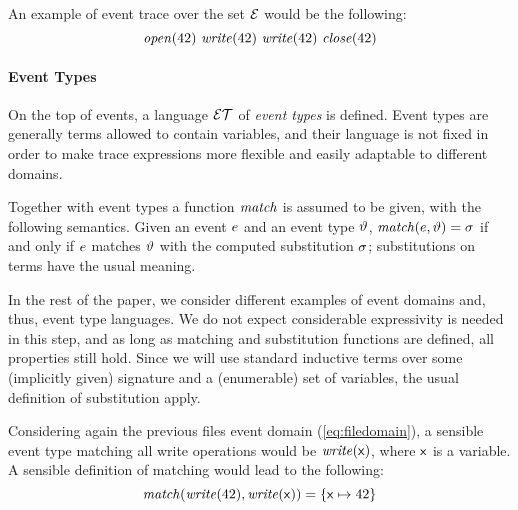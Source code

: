 An example of event trace over the set \(\mathcal{E}\) would be the following:
\begin{equation} \label{eq:trace}
	\mathit{open}(42)\ \mathit{write}(42)\ \mathit{write}(42)\ \mathit{close}(42)
\end{equation}

\paragraph{Event Types}
On the top of events, a language \(\mathcal{ET}\) of \emph{event types} is defined.
Event types are generally terms allowed to contain variables, and their language is not fixed in order to make trace expressions more flexible and easily adaptable to different domains.

Together with event types a function \(\mathit{match}\) is assumed to be given, with the following semantics.
Given an event \(e\) and an event type \(\vartheta\), \(\mathit{match}(e, \vartheta) = \sigma\) if and only if \(e\) matches \(\vartheta\) with the computed substitution \(\sigma\); substitutions on terms have the usual meaning.

In the rest of the paper, we consider different examples of event domains and, thus, event type languages.
We do not expect considerable expressivity is needed in this step, and as long as matching and substitution functions are defined, all properties still hold.
Since we will use standard inductive terms over some (implicitly given) signature and a (enumerable) set of variables, the usual definition of substitution apply.

Considering again the previous files event domain (\ref{eq:filedomain}), a sensible event type matching all write operations would be \(\mathit{write}(\mathsf{x})\), where \(\mathsf{x}\) is a variable.
A sensible definition of matching would lead to the following:
\[ \mathit{match}(\mathit{write}(42), \mathit{write}(\mathsf{x})) = \{ \mathsf{x} \mapsto 42 \} \]



